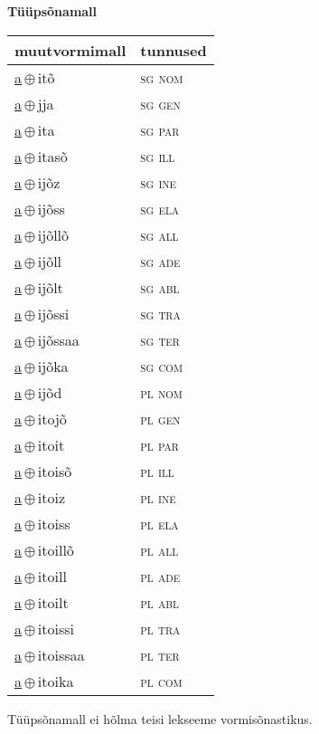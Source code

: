 

\vspace{3.5em}
\noindent \begin{minipage}{\textwidth}
\noindent \textbf{Tüüpsõnamall \,}\\

\begin{sideways}
\begin{tabular}{l l}
muutvormimall & tunnused \\
\hline
\underline{a}\,$\oplus$\,itõ & \textsc{ sg nom } \\
\underline{a}\,$\oplus$\,jja & \textsc{ sg gen } \\
\underline{a}\,$\oplus$\,ita & \textsc{ sg par } \\
\underline{a}\,$\oplus$\,itasõ & \textsc{ sg ill } \\
\underline{a}\,$\oplus$\,ijõz & \textsc{ sg ine } \\
\underline{a}\,$\oplus$\,ijõss & \textsc{ sg ela } \\
\underline{a}\,$\oplus$\,ijõllõ & \textsc{ sg all } \\
\underline{a}\,$\oplus$\,ijõll & \textsc{ sg ade } \\
\underline{a}\,$\oplus$\,ijõlt & \textsc{ sg abl } \\
\underline{a}\,$\oplus$\,ijõssi & \textsc{ sg tra } \\
\underline{a}\,$\oplus$\,ijõssaa & \textsc{ sg ter } \\
\underline{a}\,$\oplus$\,ijõka & \textsc{ sg com } \\
\underline{a}\,$\oplus$\,ijõd & \textsc{ pl nom } \\
\underline{a}\,$\oplus$\,itojõ & \textsc{ pl gen } \\
\underline{a}\,$\oplus$\,itoit & \textsc{ pl par } \\
\underline{a}\,$\oplus$\,itoisõ & \textsc{ pl ill } \\
\underline{a}\,$\oplus$\,itoiz & \textsc{ pl ine } \\
\underline{a}\,$\oplus$\,itoiss & \textsc{ pl ela } \\
\underline{a}\,$\oplus$\,itoillõ & \textsc{ pl all } \\
\underline{a}\,$\oplus$\,itoill & \textsc{ pl ade } \\
\underline{a}\,$\oplus$\,itoilt & \textsc{ pl abl } \\
\underline{a}\,$\oplus$\,itoissi & \textsc{ pl tra } \\
\underline{a}\,$\oplus$\,itoissaa & \textsc{ pl ter } \\
\underline{a}\,$\oplus$\,itoika & \textsc{ pl com } \\
\end{tabular}
\end{sideways}
\label{tab:tüüpsõnamall-aitõ}

\end{minipage}

 
\vspace{1em}
\noindent Tüüpsõnamall  ei hõlma teisi lekseeme vormi\-sõnastikus.
